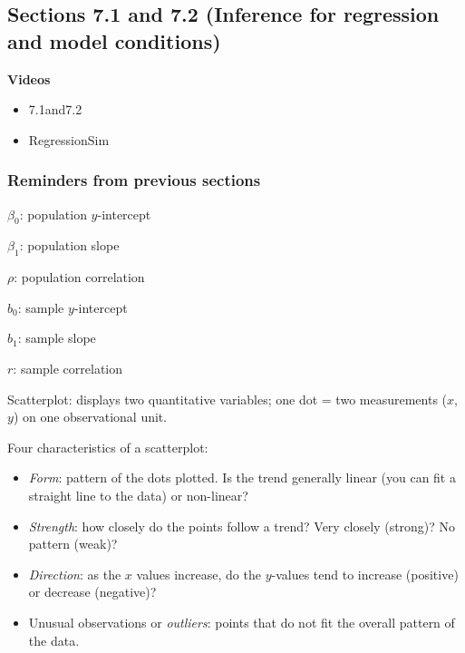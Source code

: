 \documentclass[
]{report}
\providecommand{\tightlist}{%
  \setlength{\itemsep}{0pt}\setlength{\parskip}{0pt}}
\begin{document}
\hypertarget{sections-7.1-and-7.2-inference-for-regression-and-model-conditions}{%
\subsection*{Sections 7.1 and 7.2 (Inference for regression and model conditions)}\label{sections-7.1-and-7.2-inference-for-regression-and-model-conditions}}

\textbf{Videos}

\begin{itemize}
\tightlist
\item
  7.1and7.2
\item
  RegressionSim
\end{itemize}


\hypertarget{reminders-from-previous-sections-9}{%
\subsubsection*{Reminders from previous sections}\label{reminders-from-previous-sections-9}}

\(\beta_0\): population \(y\)-intercept

\(\beta_1\): population slope

\(\rho\): population correlation

\(b_0\): sample \(y\)-intercept

\(b_1\): sample slope

\(r\): sample correlation

Scatterplot: displays two quantitative variables; one dot = two measurements (\(x\), \(y\)) on one observational unit.

Four characteristics of a scatterplot:

\begin{itemize}
\tightlist
\item
  \emph{Form}: pattern of the dots plotted. Is the trend generally linear (you can fit a straight line to the data) or non-linear?\\
\item
  \emph{Strength}: how closely do the points follow a trend? Very closely (strong)? No pattern (weak)?\\
\item
  \emph{Direction}: as the \(x\) values increase, do the \(y\)-values tend to increase (positive) or decrease (negative)?\\
\item
  Unusual observations or \emph{outliers}: points that do not fit the overall pattern of the data.
\end{itemize}
\end{document}
